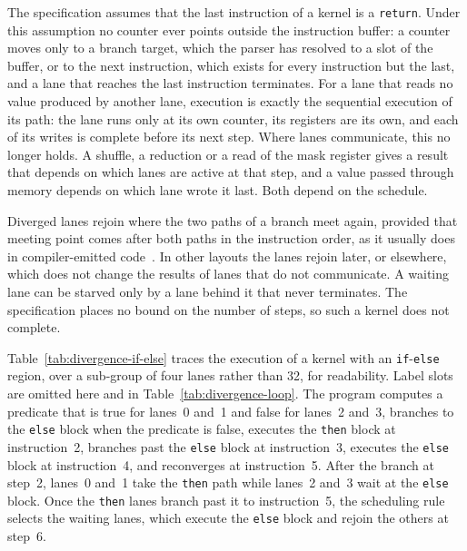 The specification assumes that the last instruction of a kernel is a
\texttt{return}. Under this assumption no counter ever points outside the
instruction buffer: a counter moves only to
a branch target, which the parser has resolved to a slot of the buffer, or
to the next instruction, which exists for every instruction but the last,
and a lane that reaches the last instruction terminates. For a lane that
reads no value produced by another lane, execution is exactly the
sequential execution of its path: the lane runs only at its own counter,
its registers are its own, and each of its writes is complete before its
next step. Where lanes communicate, this no longer holds. A shuffle, a reduction or a
read of the mask register gives a result that depends on which lanes are
active at that step, and a value passed through memory depends on which
lane wrote it last. Both depend on the schedule.

Diverged lanes rejoin where the two paths of a branch meet again, provided
that meeting point comes after both paths in the instruction order, as it
usually does in compiler-emitted code~\cite{collange-stackless}. In other
layouts the lanes rejoin later, or elsewhere, which does not change the
results of lanes that do not communicate. A waiting lane can be starved
only by a lane behind it that never terminates. The specification places
no bound on the number of steps, so such a kernel does not complete.

Table~\ref{tab:divergence-if-else} traces the execution of a kernel with
an \texttt{if}-\texttt{else} region, over a sub-group of four lanes rather
than 32, for readability. Label slots are omitted here and in
Table~\ref{tab:divergence-loop}. The program computes a predicate that is
true for lanes~0 and~1 and false for lanes~2 and~3, branches to the
\texttt{else} block when the predicate is false, executes the
\texttt{then} block at instruction~2, branches past the \texttt{else}
block at instruction~3, executes the \texttt{else} block at
instruction~4, and reconverges at instruction~5. After the branch at
step~2, lanes~0 and~1 take the \texttt{then} path while lanes~2 and~3
wait at the \texttt{else} block. Once the \texttt{then} lanes branch past
it to instruction~5, the scheduling rule selects the waiting lanes, which
execute the \texttt{else} block and rejoin the others at step~6.

